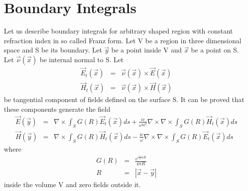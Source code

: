 \documentclass[12pt]{article}
\begin{document}
\section{Boundary Integrals}
Let us describe boundary integrals for arbitrary shaped region with constant refraction index in so called Franz form.
Let V be a region in three dimensional space and S be its boundary. Let $\vec y$ be a point inside V and $\vec x$ be a point on S. Let $\vec \nu(\vec x)$ be internal normal to S.  Let 
\begin{eqnarray}
	\vec E_t(\vec x)&=&\vec \nu(\vec x) \times \vec E(\vec x) \nonumber \\
	\vec H_t(\vec x)&=&\vec \nu(\vec x) \times \vec H(\vec x) \label{tang}
\end{eqnarray}
be tangential component of fields defined on the surface S. It can be proved that these components generate the field 
\begin{eqnarray}
	\vec E(\vec y)&=&\nabla \times \int_S G(R)\vec  E_t(\vec x) ds +\frac{i c}{\omega n^2} \nabla\times\nabla\times\int_S G(R) \vec  H_t(\vec x) ds \nonumber\\
	\vec H(\vec y)&=&\nabla \times \int_S G(R)\vec  H_t(\vec x) ds -\frac{i c}{\omega } \nabla\times\nabla\times\int_S G(R) \vec  E_t(\vec x) ds \label{franz} 
\end{eqnarray}
where 
\begin{eqnarray}
	G(R) &=&\frac{ e^{i \frac{\omega}{c }n R}} {4\pi R} \nonumber \\
	R&=&|\vec x-\vec y| \label{greenf}
\end{eqnarray}
inside the volume V and zero fields outside it.
\end{document}
